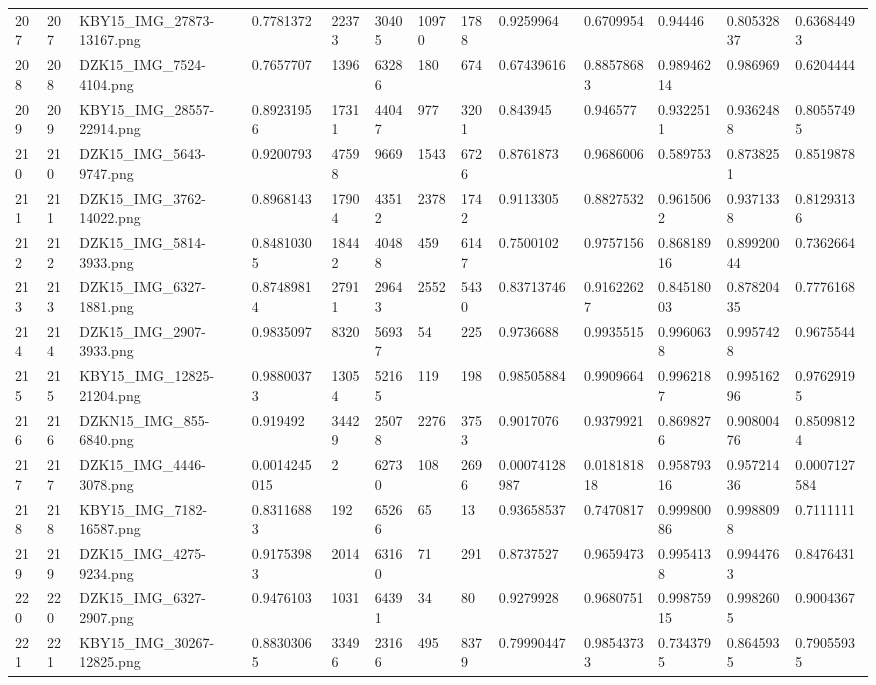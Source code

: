 \documentclass[11pt, a4paper, twoside]{report}
\begin{document}
\begin{longtable}[c]{@{}lllllllllllll@{}}
207 & 207 & KBY15\_IMG\_27873-13167.png & 0.7781372 & 22373 & 30405 & 10970 & 1788 & 0.9259964 & 0.6709954 & 0.94446 & 0.80532837 & 0.63684493 \\
208 & 208 & DZK15\_IMG\_7524-4104.png & 0.7657707 & 1396 & 63286 & 180 & 674 & 0.67439616 & 0.88578683 & 0.98946214 & 0.986969 & 0.6204444 \\
209 & 209 & KBY15\_IMG\_28557-22914.png & 0.89231956 & 17311 & 44047 & 977 & 3201 & 0.843945 & 0.946577 & 0.9322511 & 0.9362488 & 0.80557495 \\
210 & 210 & DZK15\_IMG\_5643-9747.png & 0.9200793 & 47598 & 9669 & 1543 & 6726 & 0.8761873 & 0.9686006 & 0.589753 & 0.8738251 & 0.8519878 \\
211 & 211 & DZK15\_IMG\_3762-14022.png & 0.8968143 & 17904 & 43512 & 2378 & 1742 & 0.9113305 & 0.8827532 & 0.9615062 & 0.9371338 & 0.81293136 \\
212 & 212 & DZK15\_IMG\_5814-3933.png & 0.84810305 & 18442 & 40488 & 459 & 6147 & 0.7500102 & 0.9757156 & 0.86818916 & 0.89920044 & 0.7362664 \\
213 & 213 & DZK15\_IMG\_6327-1881.png & 0.87489814 & 27911 & 29643 & 2552 & 5430 & 0.83713746 & 0.91622627 & 0.84518003 & 0.87820435 & 0.7776168 \\
214 & 214 & DZK15\_IMG\_2907-3933.png & 0.9835097 & 8320 & 56937 & 54 & 225 & 0.9736688 & 0.9935515 & 0.9960638 & 0.9957428 & 0.9675544 \\
215 & 215 & KBY15\_IMG\_12825-21204.png & 0.98800373 & 13054 & 52165 & 119 & 198 & 0.98505884 & 0.9909664 & 0.9962187 & 0.99516296 & 0.97629195 \\
216 & 216 & DZKN15\_IMG\_855-6840.png & 0.919492 & 34429 & 25078 & 2276 & 3753 & 0.9017076 & 0.9379921 & 0.8698276 & 0.90800476 & 0.85098124 \\
217 & 217 & DZK15\_IMG\_4446-3078.png & 0.0014245015 & 2 & 62730 & 108 & 2696 & 0.00074128987 & 0.018181818 & 0.95879316 & 0.95721436 & 0.0007127584 \\
218 & 218 & KBY15\_IMG\_7182-16587.png & 0.83116883 & 192 & 65266 & 65 & 13 & 0.93658537 & 0.7470817 & 0.99980086 & 0.9988098 & 0.7111111 \\
219 & 219 & DZK15\_IMG\_4275-9234.png & 0.91753983 & 2014 & 63160 & 71 & 291 & 0.8737527 & 0.9659473 & 0.9954138 & 0.9944763 & 0.8476431 \\
220 & 220 & DZK15\_IMG\_6327-2907.png & 0.9476103 & 1031 & 64391 & 34 & 80 & 0.9279928 & 0.9680751 & 0.99875915 & 0.9982605 & 0.9004367 \\
221 & 221 & KBY15\_IMG\_30267-12825.png & 0.88303065 & 33496 & 23166 & 495 & 8379 & 0.79990447 & 0.98543733 & 0.7343795 & 0.8645935 & 0.79055935 \\

\end{longtable}
\end{document}
